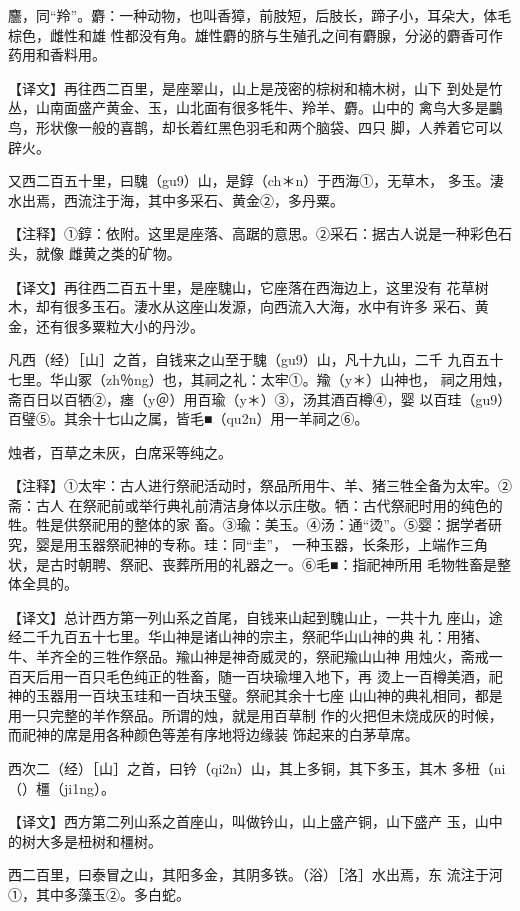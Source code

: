 \documentclass[a4paper,12pt,UTF8,twoside]{ctexbook}
\begin{document}
麢，同“羚”。麝：一种动物，也叫香獐，前肢短，后肢长，蹄子小，耳朵大，体毛棕色，雌性和雄 性都没有角。雄性麝的脐与生殖孔之间有麝腺，分泌的麝香可作药用和香料用。

【译文】再往西二百里，是座翠山，山上是茂密的棕树和楠木树，山下 到处是竹丛，山南面盛产黄金、玉，山北面有很多牦牛、羚羊、麝。山中的 禽鸟大多是鸓鸟，形状像一般的喜鹊，却长着红黑色羽毛和两个脑袋、四只 脚，人养着它可以辟火。

又西二百五十里，曰騩（gu9）山，是錞（ch＊n）于西海①，无草木， 多玉。淒水出焉，西流注于海，其中多采石、黄金②，多丹粟。

【注释】①錞：依附。这里是座落、高踞的意思。②采石：据古人说是一种彩色石头，就像 雌黄之类的矿物。

【译文】再往西二百五十里，是座騩山，它座落在西海边上，这里没有 花草树木，却有很多玉石。淒水从这座山发源，向西流入大海，水中有许多 采石、黄金，还有很多粟粒大小的丹沙。

凡西（经）［山］之首，自钱来之山至于騩（gu9）山，凡十九山，二千 九百五十七里。华山冢（zh％ng）也，其祠之礼：太牢①。羭（y＊）山神也， 祠之用烛，斋百日以百牺②，瘗（y＠）用百瑜（y＊）③，汤其酒百樽④，婴 以百珪（gu9）百璧⑤。其余十七山之属，皆毛■（qu2n）用一羊祠之⑥。

烛者，百草之未灰，白席采等纯之。

【注释】①太牢：古人进行祭祀活动时，祭品所用牛、羊、猪三牲全备为太牢。②斋：古人 在祭祀前或举行典礼前清洁身体以示庄敬。牺：古代祭祀时用的纯色的牲。牲是供祭祀用的整体的家 畜。③瑜：美玉。④汤：通“烫”。⑤婴：据学者研究，婴是用玉器祭祀神的专称。珪：同“圭”， 一种玉器，长条形，上端作三角状，是古时朝聘、祭祀、丧葬所用的礼器之一。⑥毛■：指祀神所用 毛物牲畜是整体全具的。

【译文】总计西方第一列山系之首尾，自钱来山起到騩山止，一共十九 座山，途经二千九百五十七里。华山神是诸山神的宗主，祭祀华山山神的典 礼：用猪、牛、羊齐全的三牲作祭品。羭山神是神奇威灵的，祭祀羭山山神 用烛火，斋戒一百天后用一百只毛色纯正的牲畜，随一百块瑜埋入地下，再 烫上一百樽美酒，祀神的玉器用一百块玉珪和一百块玉璧。祭祀其余十七座 山山神的典礼相同，都是用一只完整的羊作祭品。所谓的烛，就是用百草制 作的火把但未烧成灰的时候，而祀神的席是用各种颜色等差有序地将边缘装 饰起来的白茅草席。

西次二（经）［山］之首，曰钤（qi2n）山，其上多铜，其下多玉，其木 多杻（ni（）橿（ji1ng）。

【译文】西方第二列山系之首座山，叫做钤山，山上盛产铜，山下盛产 玉，山中的树大多是杻树和橿树。

西二百里，曰泰冒之山，其阳多金，其阴多铁。（浴）［洛］水出焉，东 流注于河①，其中多藻玉②。多白蛇。
\end{document}

